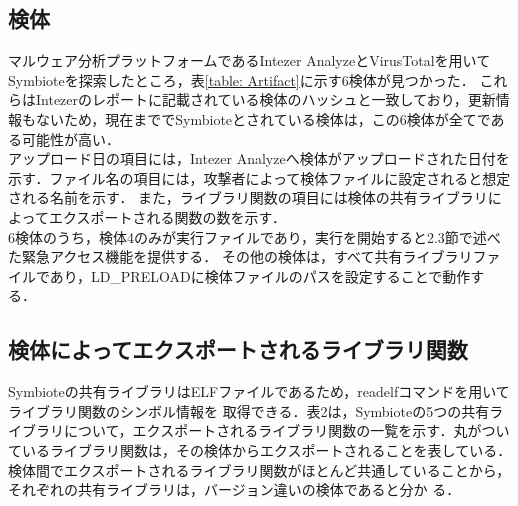 \documentclass[submit,techreq,noauthor]{eco}	%
\begin{document}
\subsection{検体}
マルウェア分析プラットフォームであるIntezer AnalyzeとVirusTotalを用いてSymbioteを探索したところ，表\ref{table: Artifact}に示す6検体が見つかった．
これらはIntezerのレポートに記載されている検体のハッシュと一致しており，更新情報もないため，現在まででSymbioteとされている検体は，この6検体が全てである可能性が高い．\\
アップロード日の項目には，Intezer Analyzeへ検体がアップロードされた日付を示す．ファイル名の項目には，攻撃者によって検体ファイルに設定されると想定される名前を示す．
また，ライブラリ関数の項目には検体の共有ライブラリによってエクスポートされる関数の数を示す．\\
\indent
6検体のうち，検体4のみが実行ファイルであり，実行を開始すると2.3節で述べた緊急アクセス機能を提供する．
その他の検体は，すべて共有ライブラリファイルであり，LD\_PRELOADに検体ファイルのパスを設定することで動作する．

\subsection{検体によってエクスポートされるライブラリ関数}
Symbioteの共有ライブラリはELFファイルであるため，readelfコマンドを用いてライブラリ関数のシンボル情報を
取得できる．表2は，Symbioteの5つの共有ライブラリについて，エクスポートされるライブラリ関数の一覧を示す．丸がついているライブラリ関数は，その検体からエクスポートされることを表している．
検体間でエクスポートされるライブラリ関数がほとんど共通していることから，それぞれの共有ライブラリは，バージョン違いの検体であると分か
る．
\end{document}
